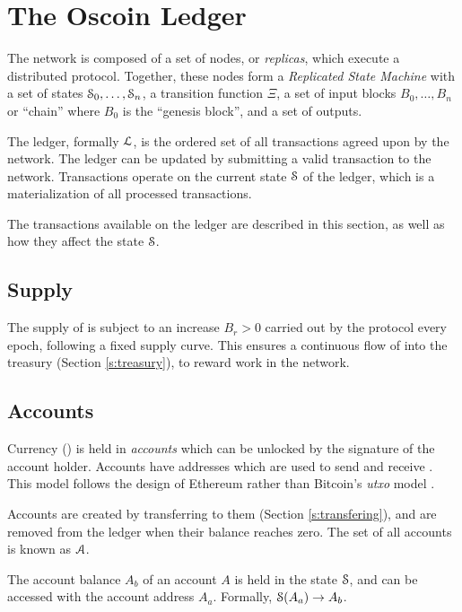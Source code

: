 \section{The Oscoin Ledger}
\label{s:ledger}

\def\posnat{\mathbb{N}_{\geq 1}}

The \oscoin{} network is composed of a set of nodes, or \emph{replicas}, which
execute a distributed protocol. Together, these nodes form a \emph{Replicated
State Machine} with a set of states $\mathcal{S}_0, \ldots, \mathcal{S}_n$, a transition
function $\Xi$, a set of input blocks $B_0, \ldots, B_n$ or ``chain'' where
$B_0$ is the ``genesis block'', and a set of outputs.

The \oscoin{} ledger, formally $\mathcal{L}$, is the ordered set of all
transactions agreed upon by the network. The ledger can be updated by submitting
a valid transaction to the network. Transactions operate on the current state
$\mathcal{S}$ of the ledger, which is a materialization of all processed transactions.

The transactions available on the ledger are described in this section, as well
as how they affect the state $\mathcal{S}$.

\subsection{Supply}

The supply of \oscoin{} is subject to an increase $B_r > 0$ carried out by the
protocol every epoch, following a fixed supply curve. This ensures a continuous
flow of \oscoin{} into the treasury (Section \ref{s:treasury}), to reward work
in the network.

\subsection{Accounts}
\label{s:accounts}

Currency (\oscoin{}) is held in \emph{accounts} which can be unlocked by the
signature of the account holder. Accounts have addresses which are used to send
and receive \oscoin{}. This model follows the design of Ethereum \cite{ethereum}
rather than Bitcoin's \emph{utxo} model \cite{bitcoin}.

Accounts are created by transferring \oscoin{} to them (Section \ref{s:transfering}),
and are removed from the ledger when their balance reaches zero. The set of all
accounts is known as $\mathcal{A}$.

The account balance $A_b$ of an account $A$ is held in the state $\mathcal{S}$, and
can be accessed with the account address $A_a$. Formally, $\mathcal{S}(A_a) \to A_b$.

